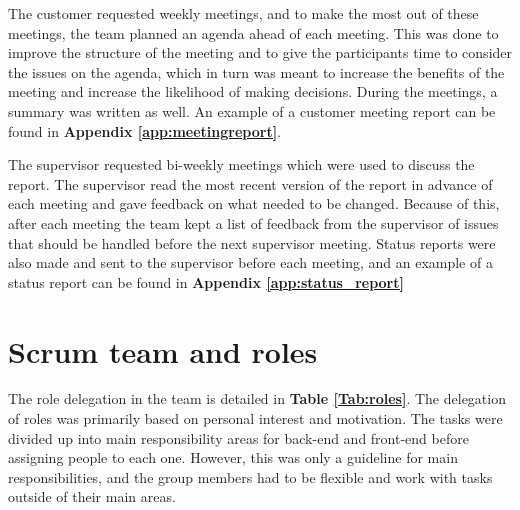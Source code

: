 The customer requested weekly meetings, and to make the most out of these meetings, the team planned an agenda ahead of each meeting. This was done to improve the structure of the meeting and to give the participants time to consider the issues on the agenda, which in turn was meant to increase the benefits of the meeting and increase the likelihood of making decisions. During the meetings, a summary was written as well. An example of a customer meeting report can be found in \textbf{Appendix \ref{app:meetingreport}}.\newline

The supervisor requested bi-weekly meetings which were used to discuss the report. The supervisor read the most recent version of the report in advance of each meeting and gave feedback on what needed to be changed. Because of this, after each meeting the team kept a list of feedback from the supervisor of issues that should be handled before the next supervisor meeting. Status reports were also made and sent to the supervisor before each meeting, and an example of a status report can be found in \textbf{Appendix \ref{app:status_report}}

\section{Scrum team and roles}
\label{sec:scrum_team_and_roles}

The role delegation in the team is detailed in \textbf{Table \ref{Tab:roles}}. The delegation of roles was primarily based on personal interest and motivation. The tasks were divided up into main responsibility areas for back-end and front-end before assigning people to each one. However, this was only a guideline for main responsibilities, and the group members had to be flexible and work with tasks outside of their main areas.


